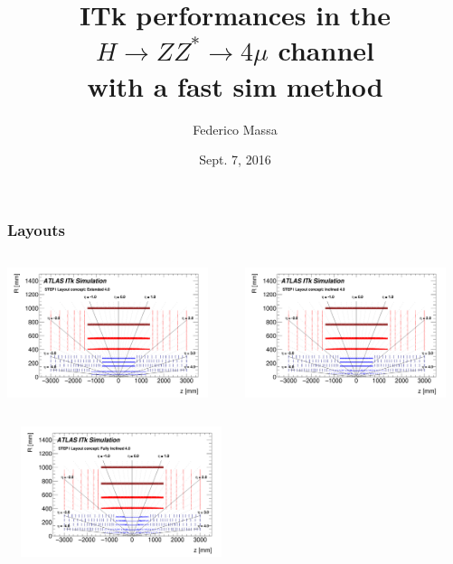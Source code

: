 \documentclass{beamer}
\title{ITk performances in the
$H \rightarrow ZZ^{*} \rightarrow 4\mu$ channel \\
with a fast sim method}
\author{Federico Massa}
\institute{ITk Simulation \& Performance}
\date{Sept. 7, 2016}
\begin{document}
\begin{frame}
\titlepage
\end{frame}


\begin{frame}
\frametitle{Layouts}
\begin{columns}
\begin{column}{0.5\textwidth}
\includegraphics[width=\textwidth,height=3.8cm]{ExtBrl4}
\end{column}
\begin{column}{0.5\textwidth}
\includegraphics[width=\textwidth,height=3.8cm]{IExtBrl4}
\end{column}
\end{columns}

\begin{center}
\includegraphics[width=0.5\textwidth,height=3.8cm]{InclBrl4}
\end{center}

\end{frame}

\end{document}

